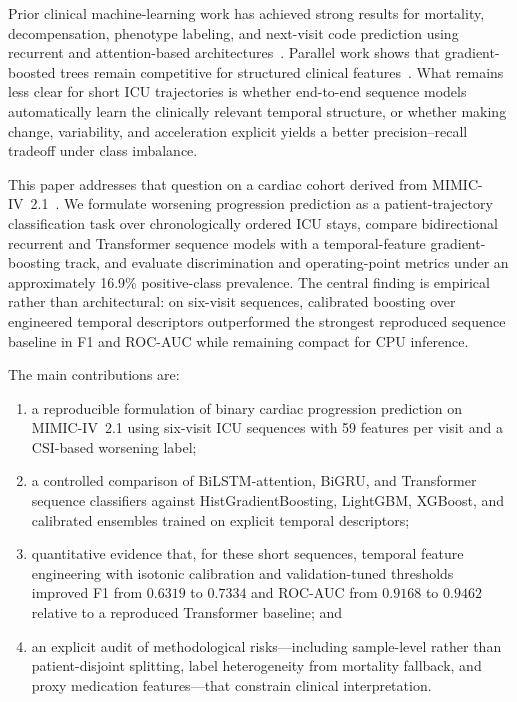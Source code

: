\documentclass[conference]{IEEEtran}
\begin{document}
Prior clinical machine-learning work has achieved strong results for mortality, decompensation, phenotype labeling, and next-visit code prediction using recurrent and attention-based architectures~\cite{harutyunyan2019mimic,choi2016doctorai,choi2016retain,lipton2016lstm}. Parallel work shows that gradient-boosted trees remain competitive for structured clinical features~\cite{chen2016xgboost,ke2017lightgbm}. What remains less clear for short ICU trajectories is whether end-to-end sequence models automatically learn the clinically relevant temporal structure, or whether making change, variability, and acceleration explicit yields a better precision--recall tradeoff under class imbalance.

This paper addresses that question on a cardiac cohort derived from MIMIC-IV~2.1~\cite{johnson2023mimic,johnson2022mimiciv21}. We formulate worsening progression prediction as a patient-trajectory classification task over chronologically ordered ICU stays, compare bidirectional recurrent and Transformer sequence models with a temporal-feature gradient-boosting track, and evaluate discrimination and operating-point metrics under an approximately 16.9\% positive-class prevalence. The central finding is empirical rather than architectural: on six-visit sequences, calibrated boosting over engineered temporal descriptors outperformed the strongest reproduced sequence baseline in F1 and ROC-AUC while remaining compact for CPU inference.

The main contributions are:
\begin{enumerate}
\item a reproducible formulation of binary cardiac progression prediction on MIMIC-IV~2.1 using six-visit ICU sequences with 59 features per visit and a CSI-based worsening label;
\item a controlled comparison of BiLSTM-attention, BiGRU, and Transformer sequence classifiers against HistGradientBoosting, LightGBM, XGBoost, and calibrated ensembles trained on explicit temporal descriptors;
\item quantitative evidence that, for these short sequences, temporal feature engineering with isotonic calibration and validation-tuned thresholds improved F1 from $0.6319$ to $0.7334$ and ROC-AUC from $0.9168$ to $0.9462$ relative to a reproduced Transformer baseline; and
\item an explicit audit of methodological risks---including sample-level rather than patient-disjoint splitting, label heterogeneity from mortality fallback, and proxy medication features---that constrain clinical interpretation.
\end{enumerate}
\end{document}
